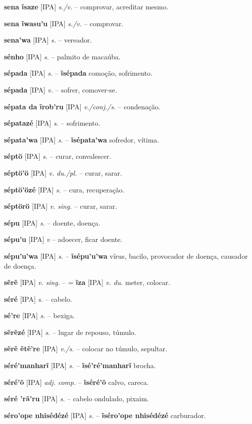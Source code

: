 \textbf{sena ĩsaze} [IPA] \textit{s./v.} -- comprovar, acreditar mesmo.

\textbf{sena ĩwasu'u} [IPA] \textit{s./v.} -- comprovar.

\textbf{sena'wa} [IPA] \textit{s.} -- vereador.

\textbf{sénho} [IPA] \textit{s.} -- palmito de macaúba.

\textbf{sépada} [IPA] \textit{s.} -- \textbf{ĩsépada} comoção, sofrimento.

\textbf{sépada} [IPA] \textit{v.} -- sofrer, comover-se.

\textbf{sépata da ĩrob'ru} [IPA] \textit{v./conj./s.} -- condenação.

\textbf{sépatazé} [IPA] \textit{s.} -- sofrimento.

\textbf{sépata'wa} [IPA] \textit{s.} -- \textbf{ĩsépata'wa} sofredor, vítima.

\textbf{séptö} [IPA] \textit{s.} -- curar, convalescer.

\textbf{séptö'ö} [IPA] \textit{v. du./pl.} -- curar, sarar.

\textbf{séptö'özé} [IPA] \textit{s.} -- cura, recuperação.

\textbf{séptörö} [IPA] \textit{v. sing.} -- curar, sarar.

\textbf{sépu} [IPA] \textit{s.} -- doente, doença.

\textbf{sépu'u} [IPA] \textit{v} -- adoecer, ficar doente.

\textbf{sépu'u'wa} [IPA] \textit{s.} -- \textbf{ĩsépu'u'wa} vírus, bacilo, provocador de doença, causador de doença.

\textbf{sẽrẽ} [IPA] \textit{v. sing.} -- = \textbf{ĩza} [IPA] \textit{v. du.} meter, colocar.

\textbf{séré} [IPA] \textit{s.} -- cabelo.

\textbf{sé're} [IPA] \textit{s.} -- bexiga.

\textbf{sẽrẽzé} [IPA] \textit{s.} -- lugar de repouso, túmulo.

\textbf{sẽrẽ ẽtẽ're} [IPA] \textit{v./s.} -- colocar no túmulo, sepultar.

\textbf{séré'manharĩ} [IPA] \textit{s.} -- \textbf{ĩsé'ré'manharĩ} brocha.

\textbf{séré'õ} [IPA] \textit{adj. comp.} -- \textbf{ĩséré'õ} calvo, careca.

\textbf{séré 'rã'ru} [IPA] \textit{s.} -- cabelo ondulado, pixaim.

\textbf{séro'ope nhisédézé} [IPA] \textit{s.} -- \textbf{ĩséro'ope nhisédézé} carburador.

